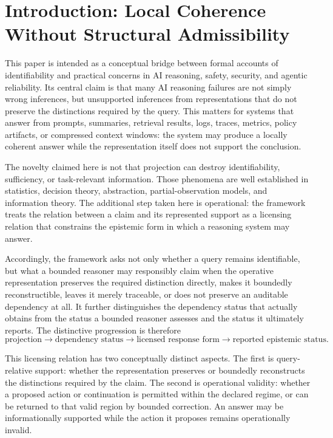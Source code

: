 \documentclass[11pt]{article}
\begin{document}
\section{Introduction: Local Coherence Without Structural Admissibility}

This paper is intended as a conceptual bridge between formal accounts of identifiability and practical concerns in AI reasoning, safety, security, and agentic reliability. Its central claim is that many AI reasoning failures are not simply wrong inferences, but unsupported inferences from representations that do not preserve the distinctions required by the query. This matters for systems that answer from prompts, summaries, retrieval results, logs, traces, metrics, policy artifacts, or compressed context windows: the system may produce a locally coherent answer while the representation itself does not support the conclusion.

The novelty claimed here is not that projection can destroy identifiability, sufficiency, or task-relevant information. Those phenomena are well established in statistics, decision theory, abstraction, partial-observation models, and information theory. The additional step taken here is operational: the framework treats the relation between a claim and its represented support as a licensing relation that constrains the epistemic form in which a reasoning system may answer.

Accordingly, the framework asks not only whether a query remains identifiable, but what a bounded reasoner may responsibly claim when the operative representation preserves the required distinction directly, makes it boundedly reconstructible, leaves it merely traceable, or does not preserve an auditable dependency at all. It further distinguishes the dependency status that actually obtains from the status a bounded reasoner assesses and the status it ultimately reports. The distinctive progression is therefore
\[
\boxed{
\text{projection}
\rightarrow
\text{dependency status}
\rightarrow
\text{licensed response form}
\rightarrow
\text{reported epistemic status}.
}
\]

This licensing relation has two conceptually distinct aspects. The first is query-relative support: whether the representation preserves or boundedly reconstructs the distinctions required by the claim. The second is operational validity: whether a proposed action or continuation is permitted within the declared regime, or can be returned to that valid region by bounded correction. An answer may be informationally supported while the action it proposes remains operationally invalid.
\end{document}
